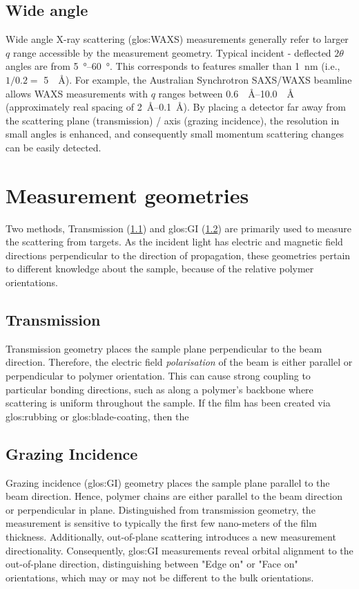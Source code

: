 \documentclass[../main.tex]{subfiles}
\begin{document}
			\subsection{Wide angle}
				Wide angle X-ray scattering (\gls{glos:WAXS}) measurements generally refer to larger $q$ range accessible by the measurement geometry. Typical incident - deflected $2\theta$ angles are from \qtyrange{5}{60}{\degree}. This corresponds to features smaller than \SI{1}{\nano\metre} (i.e., $1/0.2 = $ \SI{5}{\per\angstrom}).
				For example, the Australian Synchrotron SAXS/WAXS beamline allows WAXS measurements with $q$ ranges between \qtyrange{0.6}{10.0}{\per\angstrom} (approximately real spacing of \qtyrange{2}{0.1}{\angstrom}). By placing a detector far away from the scattering plane (transmission) / axis (grazing incidence), the resolution in small angles is enhanced, and consequently small momentum scattering changes can be easily detected.
		
		\section{Measurement geometries}\label{sec:ch5-geoms}
			Two methods, Transmission (\cref{sec:ch5-geoms-transmission}) and \gls{glos:GI} (\cref{sec:ch5-geoms-grasing_incidence}) are primarily used to measure the scattering from targets.
			As the incident light has electric and magnetic field directions perpendicular to the direction of propagation, these geometries pertain to different knowledge about the sample, because of the relative polymer orientations.
			\subsection{Transmission}\label{sec:ch5-geoms-transmission}
				Transmission geometry places the sample plane perpendicular to the beam direction. Therefore, the electric field \textit{polarisation} of the beam is either parallel or perpendicular to polymer orientation. This can cause strong coupling to particular bonding directions, such as along a polymer's backbone where scattering is uniform throughout the sample. If the film has been created via \gls{glos:rubbing} or \gls{glos:blade-coating}, then the 
						
			\subsection{Grazing Incidence}\label{sec:ch5-geoms-grasing_incidence}
				Grazing incidence (\gls{glos:GI}) geometry places the sample plane parallel to the beam direction. Hence, polymer chains are either parallel to the beam direction or perpendicular in plane.
				Distinguished from transmission geometry, the measurement is sensitive to typically the first few nano-meters of the film thickness. Additionally, out-of-plane scattering introduces a new measurement directionality. Consequently, \gls{glos:GI} measurements reveal orbital alignment to the out-of-plane direction, distinguishing between "Edge on" or "Face on" orientations, which may or may not be different to the bulk orientations.
				
\end{document}
